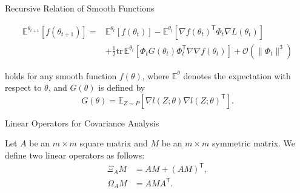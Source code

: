 \documentclass[fleqn,aspectratio=1610]{beamer}
\begin{document}
\begin{frame}[label={sec:org59f2b10}]{Recursive Relation of Smooth Functions}
\begin{lemma}[Amari, 1967]\label{sec:org8a7ee73}
\nocite{Amari1967}

\begin{align}
  \mathbb{E}^{\theta_{t+1}}\left[f(\theta_{t+1})\right]%
  =&
     \mathbb{E}^{\theta_{t}}\left[f(\theta_{t})\right]
     -\mathbb{E}^{\theta_{t}}\left[\nabla f(\theta_{t})^{\mathsf{T}}\varPhi_{t}
     \nabla L(\theta_{t})\right]\\
   &+\frac{1}{2}\mathrm{tr}\,
     \mathbb{E}^{\theta_{t}}\left[
     \varPhi_{t}G(\theta_{t})\varPhi_{t}^{\mathsf{T}}\nabla\nabla f(\theta_{t})
     \right]
     +\mathcal{O}(\|\varPhi_{t}\|^3)
\end{align}

holds for any smooth function \(f(\theta)\),
where \(\mathbb{E}^{\theta}\) 
denotes the expectation with respect to \(\theta\),
and \(G(\theta)\) is defined by
\begin{equation}
  G(\theta)=
  \mathbb{E}_{Z\sim P}
  \left[\nabla l(Z;\theta)\nabla l(Z;\theta)^{\mathsf{T}}\right].
\end{equation}
\end{lemma}
\end{frame}

\begin{frame}[label={sec:org1850318}]{Linear Operators for Covariance Analysis}
\begin{definition}[]\label{sec:orgc160ca6}
Let \(A\) be an \(m\times m\) square matrix 
and \(M\) be an \(m\times m\) symmetric matrix.
We define two linear operators as follows:
\begin{align}
  \Xi_{A}M
  &= AM+(AM)^{\mathsf{T}},\\
  \Omega_{A}M
  &= AMA^{\mathsf{T}}.
\end{align}
\end{definition}
\end{frame}
\end{document}
